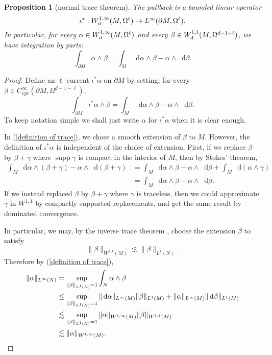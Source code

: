 \documentclass[reqno,11pt]{amsart}
\newcommand*\dif{\mathop{}\!\mathrm{d}}
\DeclareMathOperator{\supp}{supp}
\newcommand{\cpt}{\mathrm{cpt}}
\newtheorem{proposition}[theorem]{Proposition}
\theoremstyle{definition}
\numberwithin{equation}{section}
\begin{document}
\begin{proposition}[normal trace theorem]
The pullback is a bounded linear operator 
$$\iota^*: W^{1, \infty}_{\rm d}(M, \Omega^\ell) \to L^\infty(\partial M, \Omega^\ell).$$
In particular, for every $\alpha \in W^{1, \infty}_{\rm d}(M, \Omega^\ell)$ and every $\beta \in W^{1, 1}_{\rm d}(M, \Omega^{d - 1 - \ell})$, we have integration by parts:
\begin{equation}\label{Stokes trace}
	\int_{\partial M} \alpha \wedge \beta = \int_M \dif \alpha \wedge \beta - \alpha \wedge \dif \beta.
\end{equation}
\end{proposition}
\begin{proof}
Define an $\ell$-current $\iota^* \alpha$ on $\partial M$ by setting, for every $\beta \in C^\infty_\cpt(\partial M, \Omega^{d - 1 - \ell})$,
\begin{equation}\label{definition of trace}
\int_{\partial M} \iota^* \alpha \wedge \beta = \int_M \dif \alpha \wedge \beta - \alpha \wedge \dif \beta.
\end{equation}
To keep notation simple we shall just write $\alpha$ for $\iota^* \alpha$ when it is clear enough.

In (\ref{definition of trace}), we chose a smooth extension of $\beta$ to $M$.
However, the definition of $\iota^* \alpha$ is independent of the choice of extension.
First, if we replace $\beta$ by $\beta + \gamma$ where $\supp \gamma$ is compact in the interior of $M$, then by Stokes' theorem,
\begin{align*}
\int_M \dif \alpha \wedge (\beta + \gamma) - \alpha \wedge \dif (\beta + \gamma)
&= \int_M \dif \alpha \wedge \beta - \alpha \wedge \dif \beta + \int_M \dif(\alpha \wedge \gamma) \\
&= \int_M \dif \alpha \wedge \beta - \alpha \wedge \dif \beta.
\end{align*}
If we instead replaced $\beta$ by $\beta + \gamma$ where $\gamma$ is traceless, then we could approximate $\gamma$ in $W^{1, 1}$ by compactly supported replacements, and get the same result by dominated convergence.

In particular, we may, by the inverse trace theorem \cite[Teorema 1.II]{Gagliardo1957}, choose the extension $\beta$ to satisfy 
$$\|\beta\|_{W^{1, 1}(M)} \lesssim \|\beta\|_{L^1(N)}.$$
Therefore by (\ref{definition of trace}), 
\begin{align*}
\|\alpha\|_{L^\infty(N)} 
&= \sup_{\|\beta\|_{L^1(N)} = 1} \int_N \alpha \wedge \beta\\
&\leq \sup_{\|\beta\|_{L^1(N)} = 1} \|\dif \alpha\|_{L^\infty(M)} \|\beta\|_{L^1(M)} + \|\alpha\|_{L^\infty(M)} \|\dif \beta\|_{L^1(M)} \\
&\lesssim \sup_{\|\beta\|_{L^1(N)} = 1} \|\alpha\|_{W^{1, \infty}(M)} \|\beta\|_{W^{1, 1}(M)} \\
&\lesssim \|\alpha\|_{W^{1, \infty}(M)}. \qedhere
\end{align*}
\end{proof}
\end{document}
